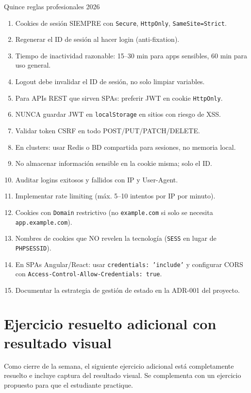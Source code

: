 \begin{cajabuenas}{Quince reglas profesionales 2026}
\begin{enumerate}
\item Cookies de sesión SIEMPRE con \texttt{Secure},
\texttt{HttpOnly}, \texttt{SameSite=Strict}.
\item Regenerar el ID de sesión al hacer login (anti-fixation).
\item Tiempo de inactividad razonable: 15--30 min para apps
sensibles, 60 min para uso general.
\item Logout debe invalidar el ID de sesión, no solo limpiar variables.
\item Para APIs REST que sirven SPAs: preferir JWT en cookie
\texttt{HttpOnly}.
\item NUNCA guardar JWT en \texttt{localStorage} en sitios con riesgo
de XSS.
\item Validar token CSRF en todo POST/PUT/PATCH/DELETE.
\item En clusters: usar Redis o BD compartida para sesiones, no
memoria local.
\item No almacenar información sensible en la cookie misma; solo el ID.
\item Auditar logins exitosos y fallidos con IP y User-Agent.
\item Implementar rate limiting (máx. 5--10 intentos por IP por minuto).
\item Cookies con \texttt{Domain} restrictivo (no
\texttt{example.com} si solo se necesita \texttt{app.example.com}).
\item Nombres de cookies que NO revelen la tecnología
(\texttt{SESS} en lugar de \texttt{PHPSESSID}).
\item En SPAs Angular/React: usar \texttt{credentials: 'include'} y
configurar CORS con \texttt{Access-Control-Allow-Credentials: true}.
\item Documentar la estrategia de gestión de estado en la ADR-001 del
proyecto.
\end{enumerate}
\end{cajabuenas}

\section{Ejercicio resuelto adicional con resultado visual}

Como cierre de la semana, el siguiente ejercicio adicional
está completamente resuelto e incluye captura del resultado visual.
Se complementa con un ejercicio propuesto para que el estudiante
practique.


